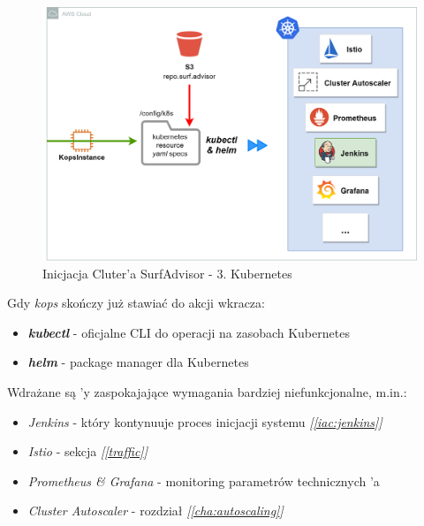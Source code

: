 \begin{figure}[!ht]
	\begin{center}
		\includegraphics[width=1\textwidth]{img/IAC-step3}
	\end{center}
	\caption{Inicjacja Cluter'a SurfAdvisor - 3. Kubernetes}
\end{figure}

Gdy \emph{kops} skończy już stawiać  do akcji wkracza:

\begin{itemize}
    \item
    \emph{\textbf{kubectl}} - oficjalne CLI do operacji na zasobach Kubernetes

    \item
    \emph{\textbf{helm}} - package manager dla Kubernetes
\end{itemize} 

Wdrażane są 'y zaspokajające wymagania bardziej niefunkcjonalne, m.in.:

\begin{itemize}
    \item
    \emph{Jenkins} - który kontynuuje proces inicjacji systemu \emph{[\ref{iac:jenkins}]}

    \item
    \emph{Istio} - sekcja \emph{[\ref{traffic}]}

    \item
    \emph{Prometheus \& Grafana} - monitoring parametrów technicznych 'a

    \item
    \emph{Cluster Autoscaler} - rozdział \emph{[\ref{cha:autoscaling}]}
\end{itemize} 


